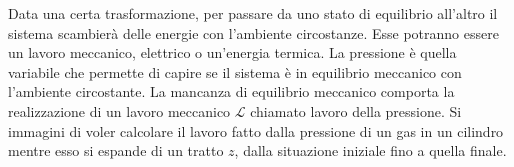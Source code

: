 \documentclass[10pt,a4paper]{book}
\begin{document}
Data una certa trasformazione, per passare da uno stato di equilibrio all'altro il sistema scambierà delle energie con l'ambiente circostanze. Esse potranno essere un lavoro meccanico, elettrico o un'energia termica.
La pressione è quella variabile che permette di capire se il sistema è in equilibrio meccanico con l'ambiente circostante. La mancanza di equilibrio meccanico comporta la realizzazione di un lavoro meccanico $\mathcal{L}$ chiamato lavoro della pressione.
Si immagini di voler calcolare il lavoro fatto dalla pressione di un gas in un cilindro mentre esso si espande di un tratto $z$, dalla situazione iniziale fino a quella finale.
\begin{figure}[htpb]
	\centering
	


	\begin{tikzpicture}[x=0.75pt,y=0.75pt,yscale=-1,xscale=1]


\end{tikzpicture}
\end{figure}
\end{document}
